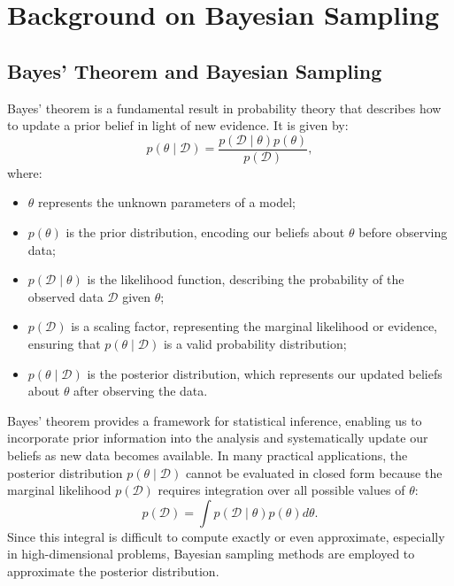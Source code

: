 \documentclass[11pt, twoside]{report}
\begin{document}

\chapter{Background on Bayesian Sampling}
\section{Bayes' Theorem and Bayesian Sampling}
Bayes' theorem is a fundamental result in probability theory that describes how to update a prior belief in light of new evidence. It is given by:
\begin{equation}
p(\theta \mid \mathcal{D}) = \frac{p(\mathcal{D} \mid \theta) p(\theta)}{p(\mathcal{D})},
\end{equation}
where:
\begin{itemize}
\item $\theta$ represents the unknown parameters of a model;
\item $p(\theta)$ is the prior distribution, encoding our beliefs about $\theta$ before observing data;
\item $p(\mathcal{D} \mid \theta)$ is the likelihood function, describing the probability of the observed data $\mathcal{D}$ given $\theta$;
\item $p(\mathcal{D})$ is a scaling factor, representing the marginal likelihood or evidence, ensuring that $p(\theta \mid \mathcal{D})$ is a valid probability distribution;
\item $p(\theta \mid \mathcal{D})$ is the posterior distribution, which represents our updated beliefs about $\theta$ after observing the data.
\end{itemize}
Bayes' theorem provides a framework for statistical inference, enabling us to incorporate prior information into the analysis and systematically update our beliefs as new data becomes available. In many practical applications, the posterior distribution
$p(\theta\mid \mathcal{D})$ cannot be evaluated in closed form because the
marginal likelihood $p(\mathcal{D})$ requires integration over all possible
values of $\theta$:
\begin{equation}
p(\mathcal{D}) = \int p(\mathcal{D} \mid \theta) p(\theta) d\theta.
\end{equation}
Since this integral is difficult to compute exactly or even approximate, especially in high-dimensional problems, Bayesian sampling methods are employed to approximate the posterior distribution.
\end{document}
